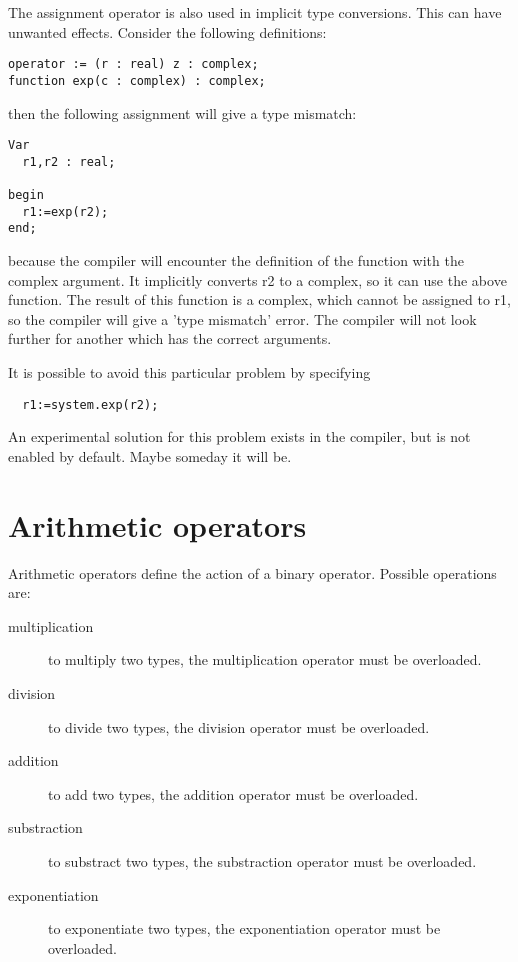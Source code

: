 \documentclass{report}
\begin{document}
\begin{remark}
The assignment operator is also used in implicit type conversions. This can
have unwanted effects. Consider the following definitions:
\begin{verbatim}
operator := (r : real) z : complex;
function exp(c : complex) : complex;
\end{verbatim}
then the following assignment will give a type mismatch:
\begin{verbatim}
Var 
  r1,r2 : real;

begin
  r1:=exp(r2);
end;
\end{verbatim}
because the compiler will encounter the definition of the  function 
with the complex argument. It implicitly converts r2 to a complex, so it can
use the above  function. The result of this function is a complex, 
which cannot be assigned to r1, so the compiler will give a 'type mismatch' 
error. The compiler will not look further for another  which has 
the correct arguments.

It is possible to avoid this particular problem by specifying
\begin{verbatim}
  r1:=system.exp(r2);
\end{verbatim}
An experimental solution for this problem exists in the compiler, but is
not enabled by default. Maybe someday it will be.
\end{remark}

\section{Arithmetic operators}

Arithmetic operators define the action of a binary operator. Possible 
operations are:
\begin{description}
\item[multiplication] to multiply two types, the \var{*} multiplication
operator must be overloaded.
\item[division] to divide two types, the \var{/} division
operator must be overloaded.
\item[addition] to add two types, the \var{+} addition
operator must be overloaded.
\item[substraction] to substract two types, the \var{-} substraction
operator must be overloaded.
\item[exponentiation] to exponentiate two types, the \var{**} exponentiation
operator must be overloaded.
\end{description}
\end{document}
